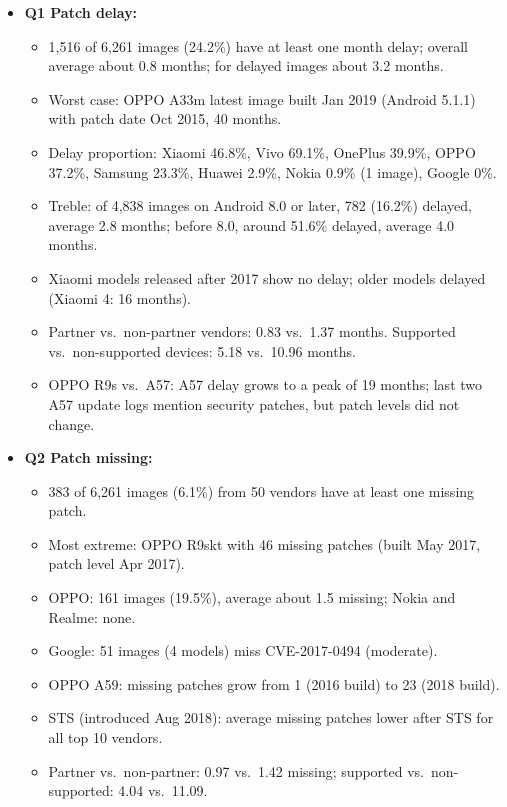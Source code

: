 \documentclass[11pt,a4paper]{article}
\begin{document}
\begin{enumerate}
    \begin{itemize}[leftmargin=*,itemsep=1pt,topsep=2pt]
        \item \textbf{Q1 Patch delay:}
        \begin{itemize}[itemsep=0pt]
            \item 1,516 of 6,261 images (24.2\%) have at least one month delay; overall average about 0.8 months; for delayed images about 3.2 months.
            \item Worst case: OPPO A33m latest image built Jan 2019 (Android 5.1.1) with patch date Oct 2015, 40 months.
            \item Delay proportion: Xiaomi 46.8\%, Vivo 69.1\%, OnePlus 39.9\%, OPPO 37.2\%, Samsung 23.3\%, Huawei 2.9\%, Nokia 0.9\% (1 image), Google 0\%.
            \item Treble: of 4,838 images on Android 8.0 or later, 782 (16.2\%) delayed, average 2.8 months; before 8.0, around 51.6\% delayed, average 4.0 months.
            \item Xiaomi models released after 2017 show no delay; older models delayed (Xiaomi 4: 16 months).
            \item Partner vs.\ non-partner vendors: 0.83 vs.\ 1.37 months. Supported vs.\ non-supported devices: 5.18 vs.\ 10.96 months.
            \item OPPO R9s vs.\ A57: A57 delay grows to a peak of 19 months; last two A57 update logs mention security patches, but patch levels did not change.
        \end{itemize}
        \item \textbf{Q2 Patch missing:}
        \begin{itemize}[itemsep=0pt]
            \item 383 of 6,261 images (6.1\%) from 50 vendors have at least one missing patch.
            \item Most extreme: OPPO R9skt with 46 missing patches (built May 2017, patch level Apr 2017).
            \item OPPO: 161 images (19.5\%), average about 1.5 missing; Nokia and Realme: none.
            \item Google: 51 images (4 models) miss CVE-2017-0494 (moderate).
            \item OPPO A59: missing patches grow from 1 (2016 build) to 23 (2018 build).
            \item STS (introduced Aug 2018): average missing patches lower after STS for all top 10 vendors.
            \item Partner vs.\ non-partner: 0.97 vs.\ 1.42 missing; supported vs.\ non-supported: 4.04 vs.\ 11.09.

\end{itemize}
\end{itemize}
\end{enumerate}
\end{document}

